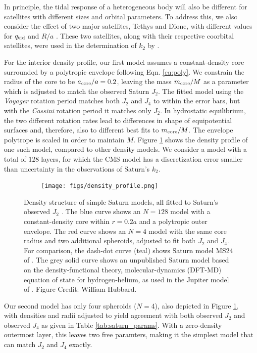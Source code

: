 In principle, the tidal response of a heterogeneous body will also be different for
satellites with different sizes and orbital parameters. To address this, we also
consider the effect of two major satellites, Tethys and Dione, with different values
for $q_{\rm tid}$ and $R/a$ \citep{archinal2011}. These two satellites, along with
their respective coorbital satellites, were used in the determination of $k_2$ by
\citet{lainey2016}.

For the interior density profile, our first model assumes a constant-density
core surrounded by a polytropic envelope following Eqn. \eqref{eq:poly}. We
constrain the radius of the core to be $a_{\rm core}/a=0.2$, leaving the mass
$m_{\rm core}/M$ as a parameter which is adjusted to match the observed Saturn
$J_2$.  The fitted model using the \textit{Voyager} rotation period matches
both $J_2$ and $J_4$ to within the error bars, but with the \textit{Cassini}
rotation period it matches only $J_2$.  In hydrostatic equilibrium, the two
different rotation rates lead to differences in shape of equipotential surfaces
and, therefore, also to different best fits to $m_{\rm core}/M$. The envelope
polytrope is scaled in order to maintain $M$. Figure
\ref{fig:density_structure} shows the density profile of one such model,
compared to other density models. We consider a model with a total of 128
layers, for which the CMS model has a discretization error \citep{wisdom2016}
smaller than uncertainty in the observations of Saturn's $k_2$.

\begin{figure}[h!]  
  \centering
    \texttt{[image: figs/density\_profile.png]} \caption{ 
Density structure of simple Saturn models, all fitted to Saturn's observed
$J_2$ \citep{Jacobson2006}.  The blue curve shows an $N=128$ model with a
constant-density core within $r=0.2 a$ and a polytropic outer envelope.  The
red curve shows an $N=4$ model with the same core radius and two additional
spheroids, adjusted to fit both $J_2$ and $J_4$.  For comparison, the dash-dot
curve (teal) shows Saturn model MS24 of \citet{gudkova1999}.  The grey solid
curve shows an unpublished Saturn model based on the density-functional theory,
molecular-dynamics (DFT-MD) equation of state for hydrogen-helium, as used in
the Jupiter model of \citet{hubbard2016}. Figure Credit: William Hubbard.
}
\label{fig:density_structure}
\end{figure}

Our second model has only four spheroids ($N=4$), also depicted in Figure
\ref{fig:density_structure}, with densities and radii adjusted to yield agreement
with both observed $J_2$ and observed $J_4$ as given in Table
\ref{tab:saturn_params}. With a zero-density outermost layer, this leaves two free
paramters, making it the simplest model that can match $J_2$ and $J_4$ exactly.

